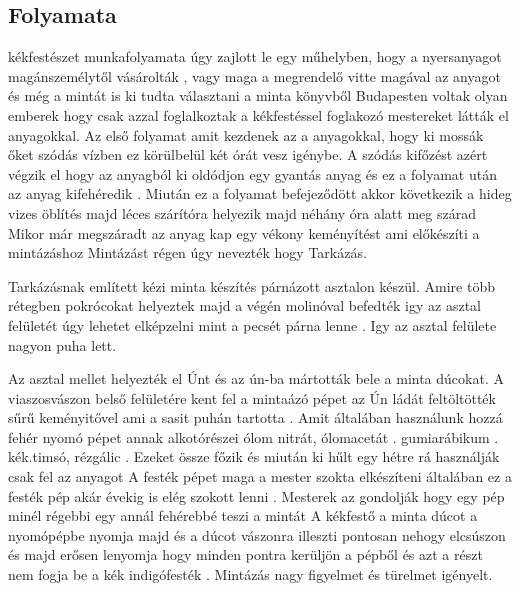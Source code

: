 \documentclass[fontsize=12pt, appendixprefix=true]{scrreprt}
\begin{document}

\subsection{Folyamata}
kékfestészet  munkafolyamata úgy zajlott le egy műhelyben, hogy a nyersanyagot magánszemélytől vásárolták ,  vagy maga a megrendelő vitte magával az anyagot és még a mintát is ki tudta választani  a minta könyvből
Budapesten voltak olyan emberek hogy csak azzal foglalkoztak a kékfestéssel foglakozó mestereket látták el anyagokkal.
Az első  folyamat amit kezdenek az a anyagokkal, hogy ki mossák őket szódás vízben ez körülbelül két órát vesz igénybe.
 A szódás kifőzést azért végzik el hogy az anyagból ki oldódjon egy gyantás anyag és ez a folyamat után  az anyag kifehéredik .
 Miután ez a folyamat befejeződött akkor következik a hideg vizes öblítés majd léces szárítóra helyezik majd néhány óra alatt meg szárad 
Mikor már megszáradt az anyag  kap egy vékony keményítést ami előkészíti a mintázáshoz 
Mintázást régen úgy nevezték  hogy Tarkázás.

Tarkázásnak említett kézi minta készítés  párnázott asztalon készül.
Amire több rétegben pokrócokat helyeztek majd a végén molinóval befedték igy az asztal felületét úgy lehetet elképzelni mint a pecsét párna lenne .
Igy az asztal felülete nagyon puha lett.

Az asztal mellet helyezték el Únt és az ún-ba mártották bele a minta dúcokat.
A viaszosvászon belső felületére kent fel a mintaázó pépet az Ún 
ládát feltöltötték sűrű keményitővel ami a sasit puhán tartotta .
Amit általában használunk hozzá  fehér nyomó pépet annak alkotórészei ólom nitrát, ólomacetát . gumiarábikum . kék.timsó, rézgálic .
Ezeket össze főzik és miután ki hűlt egy hétre rá használják csak fel  az anyagot 
A festék pépet  maga a mester szokta elkészíteni általában ez a festék pép akár évekig is elég szokott lenni .
 Mesterek  az gondolják hogy egy pép minél régebbi egy  annál fehérebbé teszi a mintát
A kékfestő a minta  dúcot a nyomópépbe nyomja majd és a dúcot vászonra illeszti pontosan nehogy elcsúszon és majd erősen lenyomja hogy minden pontra kerüljön a pépből és azt a részt nem fogja be a kék  indigófesték .
Mintázás nagy figyelmet és türelmet igényelt.
\end{document}
